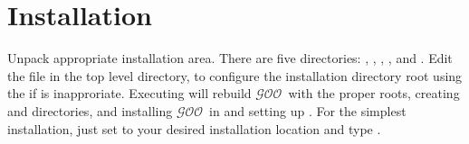 \documentclass[twoside,twocolumn,9pt]{extarticle}
\newcommand{\goo}{$\mathcal{GOO}$}
\begin{document}
% 
% 

\section{Installation}

Unpack %
appropriate installation area.  There are five directories:
, , , , and .  Edit
the  file in the top level directory, to configure the
installation directory root using the  if  is
inapproriate.  Executing  will rebuild \goo\ with
the proper roots, creating  and  directories, and
installing \goo\ in  and setting up .  For the
simplest installation, just set  to your desired
installation location and type .
\end{document}
